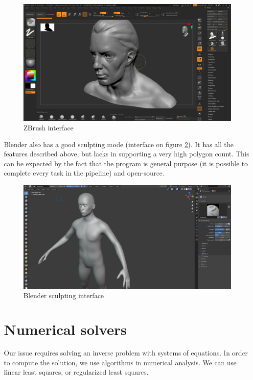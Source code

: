 \documentclass[12pt,twoside]{report}
\begin{document}
\begin{figure}[hb]
    \centering
    \includegraphics[width=59ex]{graphics/zbrushInterface.png}
    \caption{ZBrush interface}
    \label{fig:zbrushInterface}
\end{figure}

Blender also has a good sculpting mode (interface on figure \ref{fig:blender_sclupt_interface}). It has all the features described above, but lacks in supporting a very high polygon count. This can be expected by the fact that the program is general purpose (it is possible to complete every task in the pipeline) and open-source.

\begin{figure}[ht]
    \centering
    \includegraphics[width=60ex]{graphics/blender_sclupt_interface.png}
    \caption{Blender sculpting interface}
    \label{fig:blender_sclupt_interface}
\end{figure}

\section{Numerical solvers}
\label{sec:numsolv}
Our issue requires solving an inverse problem with systems of equations. In order to compute the solution, we use algorithms in numerical analysis. We can use linear least squares, or regularized least squares.
\end{document}
